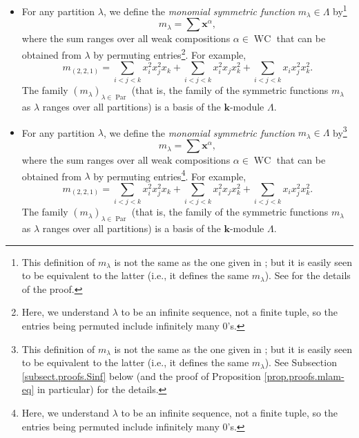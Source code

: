 \documentclass[numbers=enddot,12pt,final,onecolumn,notitlepage]{scrartcl}%
\theoremstyle{definition}
\let\sumnonlimits\sum
\renewcommand{\sum}{\sumnonlimits\limits}
\newenvironment{verlong}{}{}
\newenvironment{vershort}{}{}
\begin{document}
\begin{vershort}
\begin{itemize}
\item For any partition $\lambda$, we define the \emph{monomial symmetric
function }$m_{\lambda}\in\Lambda$ by\footnote{This definition of $m_{\lambda}$
is not the same as the one given in \cite[Definition 2.1.3]{GriRei}; but it is
easily seen to be equivalent to the latter (i.e., it defines the same
$m_{\lambda}$). See \cite{verlong} for the details of the proof.}
\[
m_{\lambda}=\sum\mathbf{x}^{\alpha},
\]
where the sum ranges over all weak compositions $\alpha\in\operatorname*{WC}$
that can be obtained from $\lambda$ by permuting entries\footnote{Here, we
understand $\lambda$ to be an infinite sequence, not a finite tuple, so the
entries being permuted include infinitely many $0$'s.}. For example,
\[
m_{\left(  2,2,1\right)  }=\sum_{i<j<k}x_{i}^{2}x_{j}^{2}x_{k}+\sum
_{i<j<k}x_{i}^{2}x_{j}x_{k}^{2}+\sum_{i<j<k}x_{i}x_{j}^{2}x_{k}^{2}.
\]
The family $\left(  m_{\lambda}\right)  _{\lambda\in\operatorname*{Par}}$
(that is, the family of the symmetric functions $m_{\lambda}$ as $\lambda$
ranges over all partitions) is a basis of the $\mathbf{k}$-module $\Lambda$.
\end{itemize}
\end{vershort}

\begin{verlong}
\begin{itemize}
\item For any partition $\lambda$, we define the \emph{monomial symmetric
function }$m_{\lambda}\in\Lambda$ by\footnote{This definition of $m_{\lambda}$
is not the same as the one given in \cite[Definition 2.1.3]{GriRei}; but it is
easily seen to be equivalent to the latter (i.e., it defines the same
$m_{\lambda}$). See Subsection \ref{subsect.proofs.Sinf} below (and the proof
of Proposition \ref{prop.proofs.mlam-eq} in particular) for the details.}
\[
m_{\lambda}=\sum\mathbf{x}^{\alpha},
\]
where the sum ranges over all weak compositions $\alpha\in\operatorname*{WC}$
that can be obtained from $\lambda$ by permuting entries\footnote{Here, we
understand $\lambda$ to be an infinite sequence, not a finite tuple, so the
entries being permuted include infinitely many $0$'s.}. For example,
\[
m_{\left(  2,2,1\right)  }=\sum_{i<j<k}x_{i}^{2}x_{j}^{2}x_{k}+\sum
_{i<j<k}x_{i}^{2}x_{j}x_{k}^{2}+\sum_{i<j<k}x_{i}x_{j}^{2}x_{k}^{2}.
\]
The family $\left(  m_{\lambda}\right)  _{\lambda\in\operatorname*{Par}}$
(that is, the family of the symmetric functions $m_{\lambda}$ as $\lambda$
ranges over all partitions) is a basis of the $\mathbf{k}$-module $\Lambda$.
\end{itemize}
\end{verlong}
\end{document}
